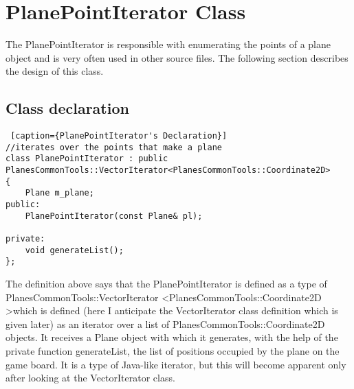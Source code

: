 \section{PlanePointIterator Class}

The PlanePointIterator is responsible with enumerating the points of a plane object and is very often used in other source files. The following section describes the design of this class.

\subsection {Class declaration} 

\begin{lstlisting} [caption={PlanePointIterator's Declaration}]
//iterates over the points that make a plane
class PlanePointIterator : public PlanesCommonTools::VectorIterator<PlanesCommonTools::Coordinate2D>
{
    Plane m_plane;
public:
    PlanePointIterator(const Plane& pl);

private:
    void generateList();
};
\end{lstlisting}

The definition above says that the PlanePointIterator is defined as a type of PlanesCommonTools::VectorIterator \textless PlanesCommonTools::Coordinate2D \textgreater which is defined (here I anticipate the VectorIterator class definition which is given later) as an iterator over a list of PlanesCommonTools::Coordinate2D objects. It receives a Plane object with which it generates, with the help of the private function generateList, the list of positions occupied by the plane on the game board. It is a type of Java-like iterator, but this will become apparent only after looking at the VectorIterator class. 

